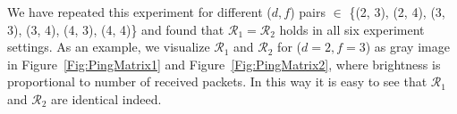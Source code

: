 We have repeated this experiment for different ($d, f$) pairs $\in$
\{(2, 3), (2, 4), (3, 3), (3, 4), (4, 3), (4, 4)\} and found that
$\mathcal{R}_1 = \mathcal{R}_2$ holds in all six experiment settings.
As an example, we visualize $\mathcal{R}_1$ and $\mathcal{R}_2$ for ($d=2, f=3$) as gray image
in Figure~\ref{Fig:PingMatrix1} and Figure~\ref{Fig:PingMatrix2},
where brightness is proportional to number of received packets.
In this way it is easy to see that $\mathcal{R}_1$ and $\mathcal{R}_2$ are identical indeed.

\begin{figure}[t]
        \centering
\end{figure}
